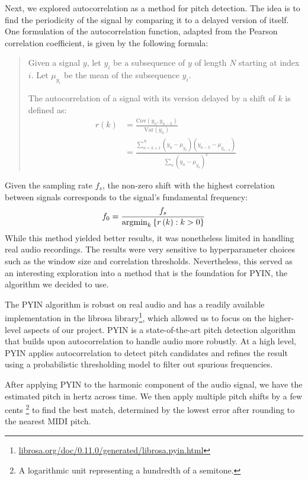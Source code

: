 
Next, we explored autocorrelation as a method for pitch detection. The idea is to find the periodicity of the signal by comparing it to a delayed version of itself. One formulation of the autocorrelation function, adapted from the Pearson correlation coefficient, is given by the following formula:
\begin{quote}
    Given a signal $y$, let $y_i$ be a subsequence of $y$ of length $N$ starting at index $i$.
    Let $\mu_{y_i}$ be the mean of the subsequence $y_i$.
    
    The autocorrelation of a signal with its version delayed by a shift of $k$ is defined as:
    \begin{align*}
        r\left(k\right)
        &= \frac{\text{Cov}\left(y_n, y_{n-k}\right)}{\text{Var}\left(y_n\right)} \\
        &= \frac{\sum_{n=k+1}^N \left(y_n - \mu_{y_n}\right) \left(y_{n-k} - \mu_{y_{n-k}}\right)}{\sum_n \left(y_n - \mu_{y_n}\right)^2}
    \end{align*}
\end{quote}
Given the sampling rate $f_s$, the non-zero shift with the highest correlation between signals corresponds to the signal's fundamental frequency:
$$f_0 = \frac{f_s}{\operatorname*{\arg\!\min}_{k}\left\{ r\left(k\right) : k > 0 \right\}}$$
While this method yielded better results, it was nonetheless limited in handling real audio recordings. The results were very sensitive to hyperparameter choices such as the window size and correlation thresholds. Nevertheless, this served as an interesting exploration into a method that is the foundation for PYIN, the algorithm we decided to use.


The PYIN algorithm \autocite{PYIN:2014} is robust on real audio and has a readily available implementation in the librosa library\footnote{\href{https://librosa.org/doc/0.11.0/generated/librosa.pyin.html}{librosa.org/doc/0.11.0/generated/librosa.pyin.html}}, which allowed us to focus on the higher-level aspects of our project. PYIN is a state-of-the-art pitch detection algorithm that builds upon autocorrelation to handle audio more robustly. At a high level, PYIN applies autocorrelation to detect pitch candidates and refines the result using a probabilistic thresholding model to filter out spurious frequencies.

After applying PYIN to the harmonic component of the audio signal, we have the estimated pitch in hertz across time. We then apply multiple pitch shifts by a few cents \footnote{A logarithmic unit representing a hundredth of a semitone.} to find the best match, determined by the lowest error after rounding to the nearest MIDI pitch.

